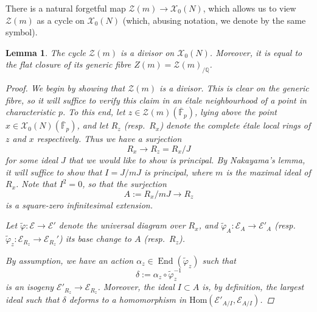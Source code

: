 \documentclass[reqno,oneside]{amsart}
\theoremstyle{plain}
\newtheorem{lemma}[theorem]{Lemma}
\theoremstyle{remark}
\numberwithin{theorem}{section}
\newcommand{\bbF}{\mathbb F}
\newcommand{\bbQ}{\mathbb Q}
\newcommand{\calE}{\mathcal E}
\newcommand{\calX}{\mathcal X}
\newcommand{\calZ}{\mathcal Z}
\newcommand{\Hom}{\mathrm{Hom}}
\DeclareMathOperator{\End}{End}
\begin{document}
	
	There is a natural forgetful map $\calZ(m) \to \calX_0(N)$, which allows us to view $\calZ(m)$ as a cycle on $\calX_0(N)$ (which, abusing notation, we denote by the same symbol).
	
	\begin{lemma}
		The cycle $\calZ(m)$ is a divisor on $\calX_0(N)$. Moreover, it is equal to the flat closure of its generic fibre $Z(m) = \calZ(m)_{/\bbQ}$. 			\begin{proof}
			We begin by showing that $\calZ(m)$ is a divisor. This is clear on the generic fibre, so it will suffice to verify this claim in an \'etale neighbourhood of a point in characteristic $p$. To this end, let $z \in \calZ(m)(\bar{\bbF}_p)$, lying above the point $x \in \calX_0(N)(\bar{\bbF}_p)$, and let $R_z$ (resp.\ $R_x$) denote the complete \'etale local rings of $z$ and $x$ respectively.
			Thus we have a surjection
			\begin{equation}
			R_x \to R_z = R_x / J
			\end{equation}			
			for some ideal $J$ that we would like to show is principal. By Nakayama's lemma, it will suffice to show that $I = J/mJ$ is principal, where $m$ is the maximal ideal of $R_x$. Note that $I^2 = 0$, so that the surjection
			\begin{equation}
			A := R_x / mJ \to R_z
			\end{equation}
			is a square-zero infinitesimal extension.
			
			Let $\widetilde \varphi \colon \calE \to \calE'$ denote the universal diagram over $R_x$, and $\widetilde \varphi_A \colon \calE_A \to \calE'_A$ (resp.\ $\widetilde \varphi_z \colon \calE_{R_z} \to \calE_{R_z}'$) its base change to $A$ (resp.\ $R_z$).
			
			By assumption, we have an action $\alpha_z \in \End(\widetilde \varphi_z)$ such that
			\begin{equation}
			\delta :=  \alpha_z \circ \widetilde \varphi_z^{-1}
			\end{equation} is an isogeny $\calE'_{R_z} \to \calE_{R_z}$. Moreover, the ideal $I \subset A$ is, by definition, the largest ideal such that $\delta$ deforms to a homomorphism  in $\Hom(\calE'_{A/I}, \calE _{A/I})$.
			

\end{proof}
\end{lemma}
\end{document}
